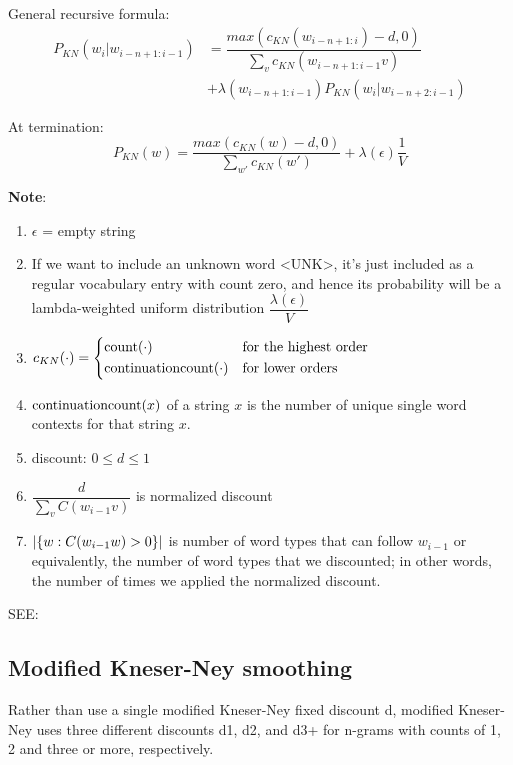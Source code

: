 General recursive formula:
\[
\begin{aligned}
    P_{KN}(w_i|w_{i-n+1:i-1})  &= \dfrac{max(c_{KN}(w_{i-n+1:i})-d,0)}{\sum_v c_{KN}(w_{i-n+1:i-1} v)} \\ 
    &+ \lambda (w_{i-n+1:i-1})P_{KN}(w_i|w_{i-n+2:i-1}) 
\end{aligned}
\]

At termination:
\[
    P_{KN}(w) = \dfrac{max(c_{KN}(w)-d,0)}{\sum_{w'} c_{KN}(w')} + \lambda(\epsilon)\dfrac{1}{V}
\]

\textbf{Note}:

\begin{enumerate}[itemsep=0.1cm]
    \item $\epsilon$ = empty string
    \item If we want to include an unknown word <UNK>, it’s just included as a regular vocabulary entry with count zero, and hence its probability will be a lambda-weighted uniform distribution \(\dfrac{\lambda(\epsilon)}{V}\)
    \item \(c_{KN}(\cdot) = \begin{dcases}
        \operatorname{count}(\cdot) & \text{for the highest order} \\
        \operatorname{continuationcount}(\cdot) & \text{for lower orders}
    \end{dcases}\)
    \item $\operatorname{continuationcount}(x)$ of a string $x$ is the number of unique single word contexts for that string $x$.
    \item discount: $0 \leq d \leq 1$ 
    \item \(\dfrac{d}{\sum_v C(w_{i-1}v)}\) is normalized discount
    \item \(\left| \left\{w : C(w_{i-1}w) > 0\right\} \right|\) is number of word types that can follow $w_{i-1}$ or equivalently, the number of word types that we discounted; in other words, the number of times we applied the normalized discount.
\end{enumerate}

\vspace{0.2cm}

SEE: 

\subsection{Modified Kneser-Ney smoothing}
Rather than use a single modified
Kneser-Ney fixed discount d, modified Kneser-Ney uses three different discounts d1, d2, and d3+ for n-grams with counts of 1, 2 and three or more, respectively.

